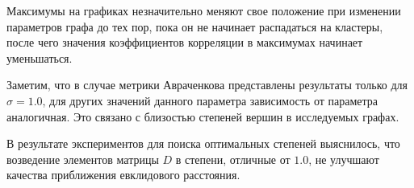Максимумы на графиках незначительно меняют свое положение при изменении параметров графа до тех пор, пока он не начинает распадаться на кластеры, после чего значения коэффициентов корреляции в максимумах начинает уменьшаться.

Заметим, что в случае метрики Авраченкова представлены результаты только для $\sigma=1.0$, для других значений данного параметра зависимость от параметра аналогичная. Это связано с близостью степеней вершин в исследуемых графах.

В результате экспериментов для поиска оптимальных степеней выяснилось, что возведение элементов матрицы $D$ в степени, отличные от $1.0$, не улучшают качества приближения евклидового расстояния.

\clearpage
